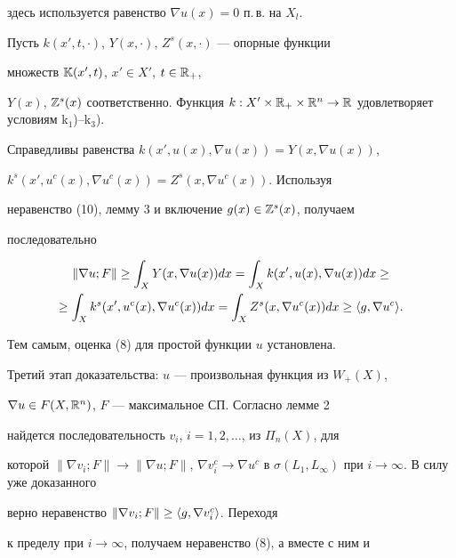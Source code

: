 здесь используется равенство $\nabla u(x)=0$ п.\,в. на $X_l$. 


 


Пусть $k(x',t,\cdot)$, $Y(x,\cdot)$, $Z^s(x,\cdot)$ --- опорные функции 


множеств $\Bbb K(x',t)$, $x'\in X'$, $t\in\Bbb R_+$, 


$Y(x)$, $\Bbb Z^s(x)$ соответственно. Функция $k:X'\times\Bbb 


R_+\times\Bbb R^n\to\Bbb R$ удовлетворяет условиям k$_1$)--k$_3$). 


Справедливы равенства $k(x',u(x),\nabla u(x))=Y(x,\nabla u(x))$, 


$k^s(x',u^c(x),\nabla u^c(x))=Z^s(x,\nabla u^c(x))$. Используя 


неравенство (10), лемму 3 и включение $g(x)\in\Bbb Z^s(x)$, получаем 


последовательно 


\begin{multline*} 


\|\nabla u;F\|\ge\int_X Y(x,\nabla u(x))d x=\int_X 


k(x',u(x),\nabla u(x))d x\ge \\ 


% 


\ge\int_X k^s(x',u^c(x),\nabla u^c(x))d x=\int_X 


Z^s(x,\nabla u^c(x))d x\ge\la g,\nabla u^c\ra. 


\end{multline*} 


Тем самым, оценка (8) для простой функции $u$ установлена. 


 


Третий этап доказательства: $u$ --- произвольная функция из $W_+(X)$, 


$\nabla u\in F(X,\Bbb R^n)$, $F$ --- максимальное СП. Согласно лемме 2 


найдется последовательность $v_i$, $i=1,2,\dotsc$, из $\Pi_n(X)$, для 


которой $\|\nabla v_i;F\|\to\|\nabla u;F\|$, $\nabla v^c_i\to\nabla 


u^c$ в $\sigma(L_1,L_\infty)$ при $i\to\infty$. В силу уже доказанного 


верно неравенство $\|\nabla v_i;F\|\ge\langle g,\nabla v^c_i\rangle$. Переходя 


к пределу при $i\to\infty$, получаем неравенство (8), а вместе с ним и 


